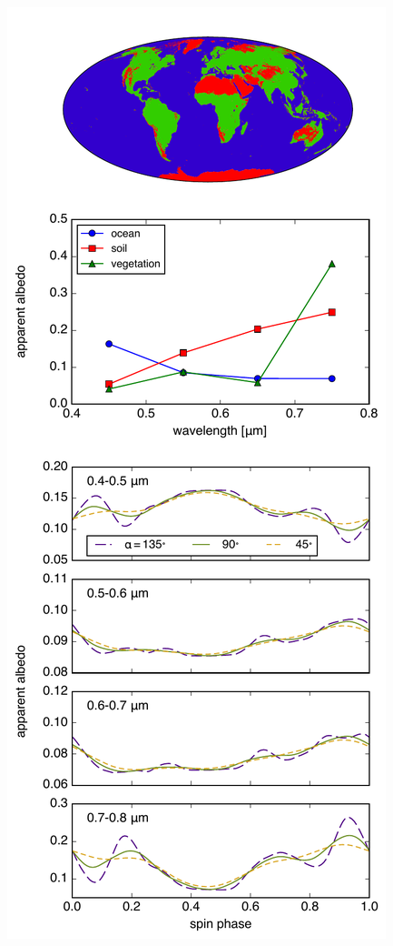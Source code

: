 \documentclass[iop,numberedappendix,apj,]{emulateapj}
\begin{document}
\begin{figure}[t]
    \begin{center}
	\includegraphics[width=\hsize]{mockdata.pdf}

\end{center}
\end{figure}
\end{document}
